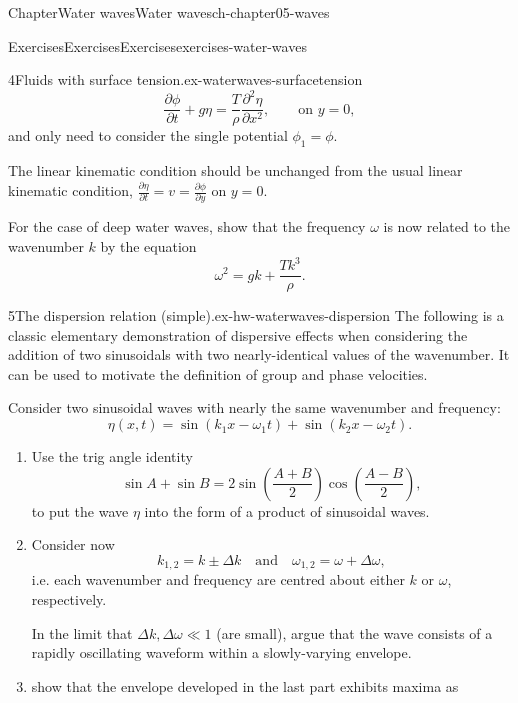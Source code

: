 \documentclass[oneside,10pt,]{book}
\numberwithin{equation}{section}
\newcommand{\pd}[2]{\frac{\partial#1}{\partial#2}}
\begin{document}
\begin{chapterptx}{Chapter}{Water waves}{}{Water waves}{}{}{ch-chapter05-waves}
\begin{exercises-section}{Exercises}{Exercises}{}{Exercises}{}{}{exercises-water-waves}
\begin{divisionexercise}{4}{Fluids with surface tension.}{}{ex-waterwaves-surfacetension}
\begin{equation*}
\pd{\phi}{t} + g\eta = \frac{T}{\rho} \pd{^2 \eta}{x^2}, \qquad \text{on $y = 0$},
\end{equation*}
and only need to consider the single potential \(\phi_1 = \phi\).%
\par
The linear kinematic condition should be unchanged from the usual linear kinematic condition, \(\pd{\eta}{t} = v = \pd{\phi}{y}\) on \(y = 0\).%
\par
For the case of deep water waves, show that the frequency \(\omega\) is now related to the wavenumber \(k\) by the equation%
\begin{equation*}
\omega^2 = gk + \frac{Tk^3}{\rho}.
\end{equation*}
%
\end{divisionexercise}%
\begin{divisionexercise}{5}{The dispersion relation (simple).}{}{ex-hw-waterwaves-dispersion}%
The following is a classic elementary demonstration of dispersive effects when considering the addition of two sinusoidals with two nearly-identical values of the wavenumber. It can be used to motivate the definition of group and phase velocities.%
 \par
Consider two sinusoidal waves with nearly the same wavenumber and frequency:%
\begin{equation*}
\eta(x, t) = \sin(k_1 x - \omega_1 t) + \sin(k_2 x - \omega_2 t). 
\end{equation*}
%
\begin{enumerate}[font=\bfseries,label=(\alph*),ref=\alph*]%
\item{}Use the trig angle identity%
\begin{equation*}
\sin A + \sin B = 2\sin\left( \frac{A + B}{2}\right) \cos\left(\frac{A - B}{2}\right),
\end{equation*}
to put the wave \(\eta\) into the form of a product of sinusoidal waves.%
\item{}Consider now%
\begin{equation*}
k_{1,2} = k \pm \Delta k \quad \text{and} \quad
\omega_{1,2} = \omega + \Delta \omega,
\end{equation*}
i.e. each wavenumber and frequency are centred about either \(k\) or \(\omega\), respectively.%
\par
In the limit that \(\Delta k, \Delta \omega \ll 1\) (are small), argue that the wave consists of a rapidly oscillating waveform within a slowly-varying envelope.%
\item{}show that the envelope developed in the last part exhibits maxima as%

\end{enumerate}
\end{divisionexercise}
\end{exercises-section}
\end{chapterptx}
\end{document}

